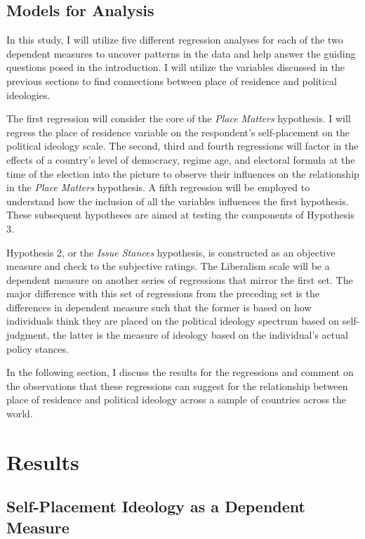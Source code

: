 \documentclass[12pt, titlepage]{article}
\newcommand\e{\emph}
\begin{document}
\subsection{Models for Analysis}

In this study, I will utilize five different regression analyses for each of the two dependent measures to uncover patterns in the data and help answer the guiding questions posed in the introduction. I will utilize the variables discussed in the previous sections to find connections between place of residence and political ideologies.

The first regression will consider the core of the \e{Place Matters} hypothesis. I will regress the place of residence variable on the respondent's self-placement on the political ideology scale. The second, third and fourth regressions will factor in the effects of a country's level of democracy, regime age, and electoral formula at the time of the election into the picture to observe their influences on the relationship in the \e{Place Matters} hypothesis. A fifth regression will be employed to understand how the inclusion of all the variables influences the first hypothesis. These subsequent hypotheses are aimed at testing the components of Hypothesis 3.

Hypothesis 2, or the \e{Issue Stances} hypothesis, is constructed as an objective measure and check to the subjective ratings. The Liberalism scale will be a dependent measure on another series of regressions that mirror the first set. The major difference with this set of regressions from the preceding set is the differences in dependent measure such that the former is based on how individuals think they are placed on the political ideology spectrum based on self-judgment, the latter is the measure of ideology based on the individual's actual policy stances.

In the following section, I discuss the results for the regressions and comment on the observations that these regressions can suggest for the relationship between place of residence and political ideology across a sample of countries across the world.

\section{Results}



\subsection{Self-Placement Ideology as a Dependent Measure}
\end{document}

